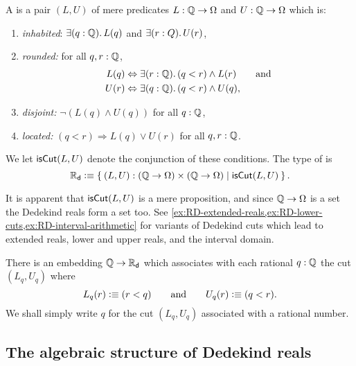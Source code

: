 \begin{defn} \label{defn:dedekind-reals}
  A 
  is a pair $(L, U)$ of mere predicates $L : \mathbb{Q} \to \Omega$ and $U
  : \mathbb{Q} \to \Omega$ which is:
  \begin{enumerate}
  \item \emph{inhabited}: $\exis{q : \Q} L(q)$ and $\exis{r : Q} U(r)$,
  \item \emph{rounded:} for all $q, r : \mathbb{Q}$,
    \begin{align*}
      L(q) &\Leftrightarrow \exis{r : \Q} (q < r) \land L(r)
      \qquad\text{and}\\
      U(r) &\Leftrightarrow \exis{q : \Q} (q < r) \land U(q),
    \end{align*}
  \item \emph{disjoint:} $\lnot (L(q) \land U(q))$ for all $q : \mathbb{Q}$,
  \item \emph{located:} $(q < r) \Rightarrow L(q) \lor U(r)$ for all $q, r : \mathbb{Q}$.
  \end{enumerate}
  We let $\mathsf{isCut}(L, U)$ denote the conjunction of these conditions. The type of
   is
  \begin{equation*}
    \RD \defeq \setof{ (L, U) : (\Q \to \Omega) \times (\Q \to \Omega) | \dcut(L,U)}.
  \end{equation*}
\end{defn}

It is apparent that $\mathsf{isCut}(L, U)$ is a mere proposition, and since $\mathbb{Q} \to \Omega$ is a
set the Dedekind reals form a set too. See
\autoref{ex:RD-extended-reals,ex:RD-lower-cuts,ex:RD-interval-arithmetic} for variants of
Dedekind cuts which lead to extended reals, lower and upper reals, and the interval
domain.

There is an embedding $\mathbb{Q} \to \mathbb{R}_\mathsf{d}$ which associates with each rational $q : \mathbb{Q}$ the cut
$(L_q, U_q)$ where
%
\begin{equation*}
  L_q(r) \vcentcolon\equiv (r < q)
  \qquad\text{and}\qquad
  U_q(r) \vcentcolon\equiv (q < r).
\end{equation*}
%
We shall simply write $q$ for the cut $(L_q, U_q)$ associated with a rational number.

\subsection{The algebraic structure of Dedekind reals}
\label{sec:algebr-struct-dedek}

